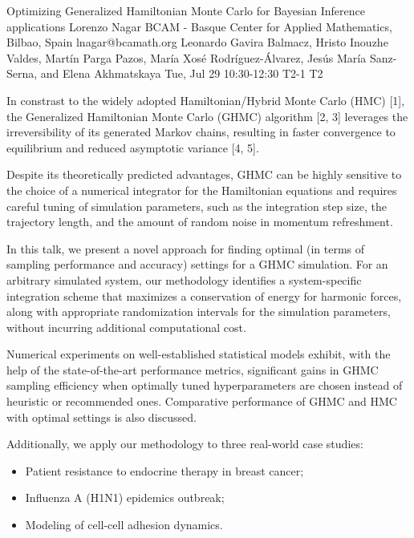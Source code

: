 \begin{talk}
  {Optimizing Generalized Hamiltonian Monte Carlo for Bayesian Inference applications}%
  {Lorenzo Nagar}%
  {BCAM - Basque Center for Applied Mathematics, Bilbao, Spain}%
  {lnagar@bcamath.org}%
  {Leonardo Gavira Balmacz, Hristo Inouzhe Valdes, Mart\'in Parga Pazos, Mar\'ia Xos\'e Rodr\'iguez-\'Alvarez, Jes\'us Mar\'ia Sanz-Serna, and Elena Akhmatskaya}%
  {}%
  {Tue, Jul 29 10:30-12:30}%
  {T2-1}%
  {T2}%
  
				
			
In constrast to the widely adopted Hamiltonian/Hybrid Monte Carlo (HMC) [1], the Generalized Hamiltonian Monte Carlo (GHMC) algorithm [2, 3] leverages the irreversibility of its generated Markov chains, resulting in faster convergence to equilibrium and reduced asymptotic variance [4, 5]. 

Despite its theoretically predicted advantages, GHMC can be highly sensitive to the choice of a numerical integrator for the Hamiltonian equations and requires careful tuning of simulation parameters, such as the integration step size, the trajectory length, and the amount of random noise in momentum refreshment.

In this talk, we present a novel approach for finding optimal (in terms of sampling performance and accuracy) settings for a GHMC simulation. For an arbitrary simulated system, our methodology identifies a system-specific integration scheme that maximizes a conservation of energy for harmonic forces, along with appropriate randomization intervals for the simulation parameters, without incurring additional computational cost.

Numerical experiments on well-established statistical models exhibit, with the help of the state-of-the-art performance metrics, significant gains in GHMC sampling efficiency when optimally tuned hyperparameters are chosen instead of heuristic or recommended ones. Comparative performance of GHMC and HMC with optimal settings is also discussed. 

Additionally, we apply our methodology to three real-world case studies:
\begin{itemize}
\item Patient resistance to endocrine therapy in breast cancer;
\item Influenza A (H1N1) epidemics outbreak;
\item Modeling of cell-cell adhesion dynamics.
\end{itemize}


\end{talk}
